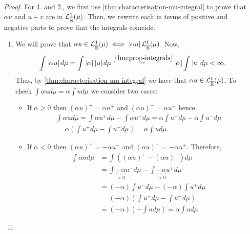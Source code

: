 \begin{proof}
	For 1. and 2., we first use \autoref{thm:characterisation-mu-integral} to prove that $\alpha u$ and $u + v$ are in $\mathcal{L}^1_{\overline{\mathbb{R}}}(\mu)$. Then, we rewrite each in terms of positive and negative parts to prove that the integrals coincide.
	\begin{enumerate}
		\item We will prove that $\alpha u \in \mathcal{L}_{\overline{\mathbb{R}}}^1(\mu) \iff \left\vert{\alpha u}\right\vert \mathcal{L}_{\overline{\mathbb{R}}}^1(\mu)$. Now,
		\begin{align*}
			\int \left\vert{\alpha u}\right\vert d\mu
			= \int \left\vert{\alpha}\right\vert \left\vert{u}\right\vert d\mu
			\overset{\ref{thm:prop-integrals}}{=} \left\vert{\alpha}\right\vert \int \left\vert{u}\right\vert d\mu < \infty.
		\end{align*}
		Thus, by \autoref{thm:characterisation-mu-integral} we have that $\alpha u \in \mathcal{L}^1_{\overline{\mathbb{R}}}(\mu)$. To check $\int \alpha u d\mu = \alpha \int u d\mu$ we consider two cases:
		\begin{itemize}
			\item If $\alpha \geq 0$ then $(\alpha u)^+ = \alpha u^+$ and $(\alpha u)^- = \alpha u^-$ hence
			\begin{align*}
				\int \alpha u d\mu
				= \int \alpha u^+d\mu - \int \alpha u^- d\mu
				= \alpha \int u^+d\mu - \alpha \int u^- d\mu\\
				= \alpha \left( \int u^+ d\mu - \int u^- d\mu \right)
				= \alpha \int u d\mu.
			\end{align*}
			\item If $\alpha < 0$ then $(\alpha u)^+ = -\alpha u^-$ and $(\alpha u)^- = -\alpha u^+$. Therefore,
			\begin{align*}
				\int \alpha u d\mu
				&= \int \left( (\alpha u)^+ - (\alpha u)^- \right)d\mu\\
				&= \int \underbrace{- \alpha}_{> 0} u^- d\mu - \int \underbrace{- \alpha}_{> 0} u^+ d\mu \\
				&= (-\alpha)\int u^- d\mu - (-\alpha)\int u^+ d\mu\\
				&= (-\alpha)\left(\int u^- d\mu - \int u^+ d\mu\right)\\
				&= (-\alpha)\left(-\int u d\mu\right) = \alpha\int u d\mu
			\end{align*}
		\end{itemize}
	

\end{enumerate}
\end{proof}
